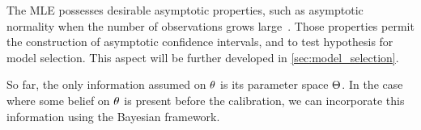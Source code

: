 \documentclass[../../Main_ManuscritThese.tex]{subfiles}
\begin{document}
The MLE possesses desirable asymptotic properties, such as asymptotic
normality when the number of observations grows
large~\citep{reid_aspects_2013}. Those properties permit the
construction of asymptotic confidence intervals, and to test
hypothesis for model selection. This aspect will be further developed
in \cref{sec:model_selection}.


So far, the only information assumed on $\theta$ is its parameter space
$\Theta$. In the case where some belief on $\theta$ is present before
the calibration, we can incorporate this information using the
Bayesian framework.
\end{document}
